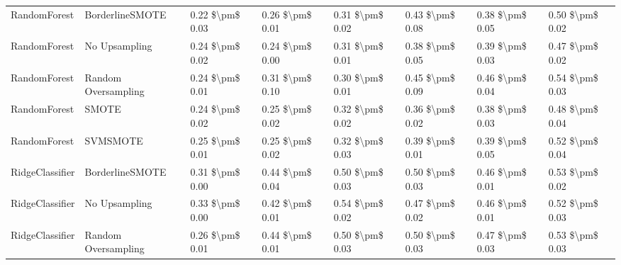 \begin{tabular}{llllllll}
                   RandomForest &               BorderlineSMOTE & 0.22 \$\textbackslash pm\$ 0.03 &           0.26 \$\textbackslash pm\$ 0.01 &       0.31 \$\textbackslash pm\$ 0.02 &        0.43 \$\textbackslash pm\$ 0.08 &                         0.38 \$\textbackslash pm\$ 0.05 &     0.50 \$\textbackslash pm\$ 0.02 \\
                   RandomForest &                 No Upsampling & 0.24 \$\textbackslash pm\$ 0.02 &           0.24 \$\textbackslash pm\$ 0.00 &       0.31 \$\textbackslash pm\$ 0.01 &        0.38 \$\textbackslash pm\$ 0.05 &                         0.39 \$\textbackslash pm\$ 0.03 &     0.47 \$\textbackslash pm\$ 0.02 \\
                   RandomForest &           Random Oversampling & 0.24 \$\textbackslash pm\$ 0.01 &           0.31 \$\textbackslash pm\$ 0.10 &       0.30 \$\textbackslash pm\$ 0.01 &        0.45 \$\textbackslash pm\$ 0.09 &                         0.46 \$\textbackslash pm\$ 0.04 &     0.54 \$\textbackslash pm\$ 0.03 \\
                   RandomForest &                         SMOTE & 0.24 \$\textbackslash pm\$ 0.02 &           0.25 \$\textbackslash pm\$ 0.02 &       0.32 \$\textbackslash pm\$ 0.02 &        0.36 \$\textbackslash pm\$ 0.02 &                         0.38 \$\textbackslash pm\$ 0.03 &     0.48 \$\textbackslash pm\$ 0.04 \\
                   RandomForest &                      SVMSMOTE & 0.25 \$\textbackslash pm\$ 0.01 &           0.25 \$\textbackslash pm\$ 0.02 &       0.32 \$\textbackslash pm\$ 0.03 &        0.39 \$\textbackslash pm\$ 0.01 &                         0.39 \$\textbackslash pm\$ 0.05 &     0.52 \$\textbackslash pm\$ 0.04 \\
                RidgeClassifier &               BorderlineSMOTE & 0.31 \$\textbackslash pm\$ 0.00 &           0.44 \$\textbackslash pm\$ 0.04 &       0.50 \$\textbackslash pm\$ 0.03 &        0.50 \$\textbackslash pm\$ 0.03 &                         0.46 \$\textbackslash pm\$ 0.01 &     0.53 \$\textbackslash pm\$ 0.02 \\
                RidgeClassifier &                 No Upsampling & 0.33 \$\textbackslash pm\$ 0.00 &           0.42 \$\textbackslash pm\$ 0.01 &       0.54 \$\textbackslash pm\$ 0.02 &        0.47 \$\textbackslash pm\$ 0.02 &                         0.46 \$\textbackslash pm\$ 0.01 &     0.52 \$\textbackslash pm\$ 0.03 \\
                RidgeClassifier &           Random Oversampling & 0.26 \$\textbackslash pm\$ 0.01 &           0.44 \$\textbackslash pm\$ 0.01 &       0.50 \$\textbackslash pm\$ 0.03 &        0.50 \$\textbackslash pm\$ 0.03 &                         0.47 \$\textbackslash pm\$ 0.03 &     0.53 \$\textbackslash pm\$ 0.03 \\

\end{tabular}
